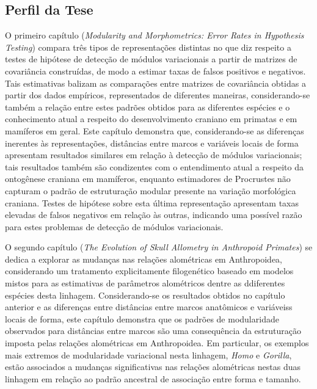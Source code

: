 \documentclass[12pt,twoside]{report}
\begin{document}
\subsection{Perfil da Tese}\label{perfil-da-tese}

O primeiro capítulo (\emph{Modularity and Morphometrics: Error Rates in
Hypothesis Testing}) compara três tipos de representações distintas no
que diz respeito a testes de hipótese de detecção de módulos
variacionais a partir de matrizes de covariância construídas, de modo a
estimar taxas de falsos positivos e negativos. Tais estimativas balizam
as comparações entre matrizes de covariância obtidas a partir dos dados
empíricos, representados de diferentes maneiras, considerando-se também
a relação entre estes padrões obtidos para as diferentes espécies e o
conhecimento atual a respeito do desenvolvimento craniano em primatas e
em mamíferos em geral. Este capítulo demonstra que, considerando-se as
diferenças inerentes às representações, distâncias entre marcos e
variáveis locais de forma apresentam resultados similares em relação à
detecção de módulos variacionais; tais resultados também são condizentes
com o entendimento atual a respeito da ontogênese craniana em mamíferos,
enquanto estimadores de Procrustes não capturam o padrão de estruturação
modular presente na variação morfológica craniana. Testes de hipótese
sobre esta última representação apresentam taxas elevadas de falsos
negativos em relação às outras, indicando uma possível razão para estes
problemas de detecção de módulos variacionais.

O segundo capítulo (\emph{The Evolution of Skull Allometry in Anthropoid
Primates}) se dedica a explorar as mudanças nas relações alométricas em
Anthropoidea, considerando um tratamento explicitamente filogenético
baseado em modelos mistos para as estimativas de parâmetros alométricos
dentre as ddiferentes espécies desta linhagem. Considerando-se os
resultados obtidos no capítulo anterior e as diferenças entre distâncias
entre marcos anatômicos e variáveiss locais de forma, este capítulo
demonstra que os padrões de modularidade observados para distâncias
entre marcos são uma consequência da estruturação imposta pelas relações
alométricas em Anthropoidea. Em particular, os exemplos mais extremos de
modularidade variacional nesta linhagem, \emph{Homo} e \emph{Gorilla},
estão associados a mudanças significativas nas relações alométricas
nestas duas linhagem em relação ao padrão ancestral de associação entre
forma e tamanho.
\end{document}
